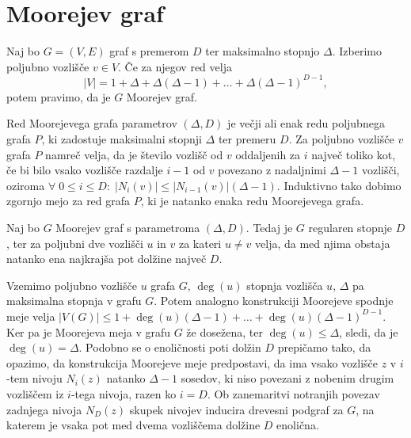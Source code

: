 \documentclass[fin1, tisk]{fmfdelo}
\begin{document}

\section{Moorejev graf}\label{sec:moorejev_graf}

\begin{definicija}
Naj bo $G = (V, E)$ graf s premerom $D$ ter maksimalno stopnjo $\Delta$.
Izberimo poljubno vozlišče $v \in V$. Če za njegov red velja
\begin{equation}
    |V| = 1 + \Delta + \Delta (\Delta - 1) + \ldots + \Delta (\Delta - 1)^{D - 1},
\end{equation}
potem pravimo, da je $G$ Moorejev graf.
\end{definicija}

\begin{opomba}
Red Moorejevega grafa parametrov $(\Delta, D)$ je večji ali enak redu 
poljubnega grafa $P$, ki zadostuje maksimalni stopnji $\Delta$ ter premeru $D$.
Za poljubno vozlišče $v$ grafa $P$ namreč velja, da je število vozlišč od $v$ 
oddaljenih za $i$ največ toliko kot, če bi bilo vsako vozlišče razdalje $i-1$ 
od $v$ povezano z nadaljnimi $\Delta - 1$ vozlišči, oziroma
$\forall\; 0 \leq i \leq D:\;|N_{i}(v)| \leq |N_{i-1}(v)|(\Delta - 1)$. Induktivno
tako dobimo zgornjo mejo za red grafa $P$, ki je natanko enaka redu Moorejevega 
grafa.
\end{opomba}

\begin{trditev}\label{tr:regularnost_in_omejitve_dolzine}
Naj bo $G$ Moorejev graf s parametroma $(\Delta, D)$. Tedaj je
$G$ regularen stopnje $D$, ter za poljubni dve vozlišči $u$ in $v$ za 
kateri $u \neq v$ velja, da med njima obstaja natanko ena najkrajša pot 
dolžine največ $D$.
\end{trditev}

\begin{dokaz}
Vzemimo poljubno vozlišče $u$ grafa $G$, $\deg(u)$ stopnja vozlišča $u$,
$\Delta$ pa maksimalna stopnja v grafu $G$. Potem analogno konstrukciji 
Moorejeve spodnje meje velja $|V(G)| \leq 1 + \deg(u)(\Delta - 1) + 
\ldots + \deg(u) (\Delta - 1)^{D - 1}$. Ker pa je Moorejeva meja v grafu
$G$ že dosežena, ter $\deg(u) \leq \Delta$, sledi, da je $\deg(u) = \Delta$.
Podobno se o enoličnosti poti dolžin $D$ prepičamo tako, da opazimo, da 
konstrukcija Moorejeve meje predpostavi, da ima vsako vozlišče $z$ v $i$-tem 
nivoju $N_i(z)$ natanko $\Delta - 1$ sosedov, ki niso povezani z nobenim drugim 
vozliščem iz $i$-tega nivoja, razen ko $i=D$. Ob zanemaritvi notranjih povezav 
zadnjega nivoja $N_D(z)$ skupek nivojev inducira drevesni podgraf za $G$, na katerem 
je vsaka pot med dvema vozliščema dolžine $D$ enolična.
\end{dokaz}
\end{document}
